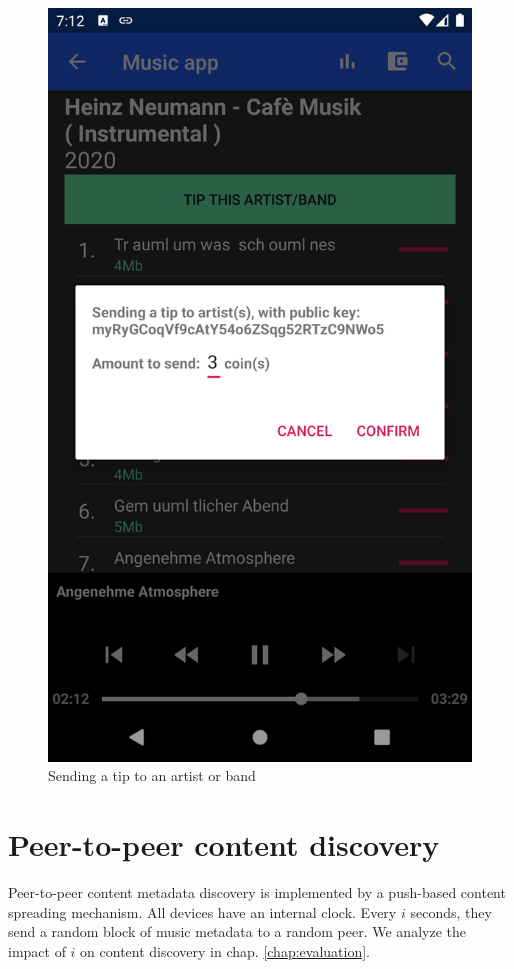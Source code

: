 \begin{figure}[]
        \includegraphics[width=1\linewidth]{implementation/send-tip}
        \caption{Sending a tip to an artist or band}
        \label{fig:tip-artist}
    \endminipage
\end{figure}

\section{Peer-to-peer content discovery}
Peer-to-peer content metadata discovery is implemented by a push-based content spreading mechanism. All devices have an internal clock. Every $i$ seconds, they send a random block of music metadata to a random peer. We analyze the impact of $i$ on content discovery in chap. \ref{chap:evaluation}.

